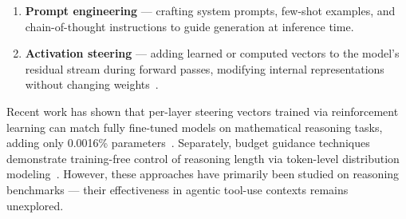 \documentclass[11pt,a4paper]{article}
\begin{document}
\begin{enumerate}
    \item \textbf{Prompt engineering} --- crafting system prompts, few-shot examples, and chain-of-thought instructions to guide generation at inference time.
    \item \textbf{Activation steering} --- adding learned or computed vectors to the model's residual stream during forward passes, modifying internal representations without changing weights~\cite{turner2023activation,li2024inference}.
\end{enumerate}

Recent work has shown that per-layer steering vectors trained via reinforcement learning can match fully fine-tuned models on mathematical reasoning tasks, adding only 0.0016\% parameters~\cite{gao2025steering}. Separately, budget guidance techniques demonstrate training-free control of reasoning length via token-level distribution modeling~\cite{li2025budget}. However, these approaches have primarily been studied on reasoning benchmarks --- their effectiveness in agentic tool-use contexts remains unexplored.
\end{document}
